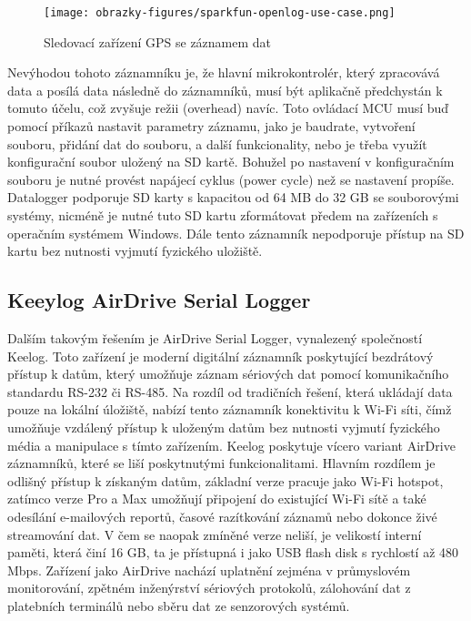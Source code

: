 \begin{figure}[h]
    \centering
    \texttt{[image: obrazky-figures/sparkfun-openlog-use-case.png]}
    
    \caption{Sledovací zařízení GPS se záznamem dat \cite{cirkit_openlog}}
    \label{fig:sparkfun-openlog-use-case}
\end{figure}

Nevýhodou tohoto záznamníku je, že hlavní mikrokontrolér, který zpracovává data a posílá data následně do záznamníků, musí být aplikačně předchystán k tomuto účelu, což zvyšuje režii (overhead) navíc. Toto ovládací MCU musí buď pomocí příkazů nastavit parametry záznamu, jako je baudrate, vytvoření souboru, přidání dat do souboru, a další funkcionality, nebo je třeba využít konfigurační soubor uložený na SD kartě. Bohužel po nastavení v konfiguračním souboru je nutné provést napájecí cyklus (power cycle) než se nastavení propíše. Datalogger podporuje SD karty s kapacitou od 64 MB do 32 GB se souborovými systémy, nicméně je nutné tuto SD kartu zformátovat předem na zařízeních s operačním systémem Windows. Dále tento záznamník nepodporuje přístup na SD kartu bez nutnosti vyjmutí fyzického uložiště.

\subsection{Keeylog AirDrive Serial Logger}
\label{keelog_airdrive_serial_datalogger}
Dalším takovým řešením je AirDrive Serial Logger, vynalezený společností Keelog. Toto zařízení je moderní digitální záznamník poskytující bezdrátový přístup k datům, který umožňuje záznam sériových dat pomocí komunikačního standardu RS-232 či RS-485. Na rozdíl od tradičních řešení, která ukládají data pouze na lokální úložiště, nabízí tento záznamník konektivitu k Wi-Fi síti, čímž umožňuje vzdálený přístup k uloženým datům bez nutnosti vyjmutí fyzického média a manipulace s tímto zařízením. Keelog poskytuje vícero variant AirDrive záznamníků, které se liší poskytnutými funkcionalitami. Hlavním rozdílem je odlišný přístup k získaným datům, základní verze pracuje jako Wi-Fi hotspot, zatímco verze Pro a Max umožňují připojení do existující Wi-Fi sítě a také odesílání e-mailových reportů, časové razítkování záznamů nebo dokonce živé streamování dat. V čem se naopak zmíněné verze neliší, je velikostí interní paměti, která činí 16 GB, ta je přístupná i jako USB flash disk s rychlostí až 480 Mbps. Zařízení jako AirDrive nachází uplatnění zejména v průmyslovém monitorování, zpětném inženýrství sériových protokolů, zálohování dat z platebních terminálů nebo sběru dat ze senzorových systémů. \cite{keelog_airdrive_serial_datalogger, keelog_airdrive_serial_datalogger_max, keelog_airdrive_serial_datalogger_pro}

